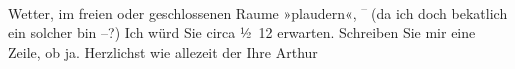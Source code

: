                Wetter, im freien oder geschlossenen Raume »plaudern«, \substVorne{}\textsuperscript{–{ }}\substDazwischen{}(\substHinten{}da ich doch beka{\geminationn}tlich ein solcher bin –?) Ich
               würd {\pb}Sie circa ½ 12 erwarten. Schreiben Sie
               mir eine Zeile, ob ja. Herzlichst wie allezeit der Ihre\pend
           \pstart \spacefill\mbox{Arthur}\pend{}\endnumbering{}  \newcommand{\dateiname}{L02424}\newcommand{\titel}{Arthur Schnitzler an Hugo Hofmannsthal, 23. 12. 1924}\newcommand{\editorInnen}{Martin Anton Müller und Gerd-Hermann Susen}
